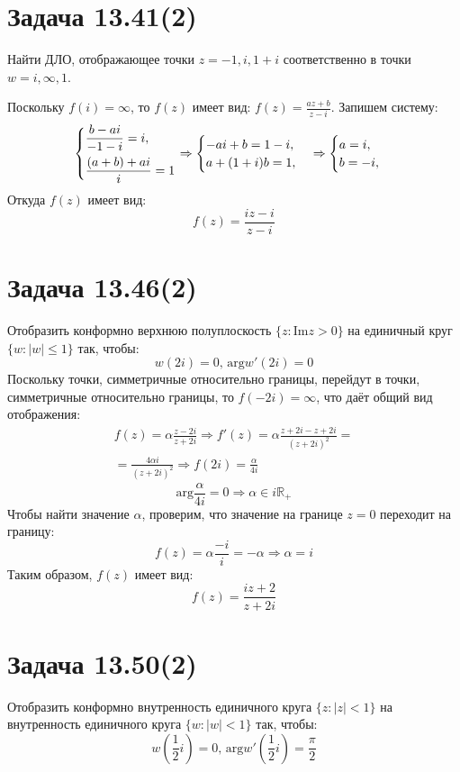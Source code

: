 \documentclass[11pt]{article}
\begin{document}
\section{Задача 13.41(2)}
\label{sec:orga8770dd}
Найти ДЛО, отображающее точки \(z = -1, i, 1 + i\) соответственно в точки \(w = i, \infty, 1\).

Поскольку \(f(i) = \infty\), то \(f(z)\) имеет вид:
\(f(z) = \frac{az + b}{z - i}\). Запишем систему:
\begin{multline*}
\begin{dcases}
\frac{b - ai}{-1 - i} = i, \\
\frac{(a + b) + ai}i = 1
\end{dcases}
\Rightarrow
\begin{cases}
-ai + b = 1 - i, \\
a + (1 + i)b = 1,
\end{cases}
\Rightarrow
\begin{cases}
a = i, \\
b = -i,
\end{cases}
\end{multline*}
Откуда \(f(z)\) имеет вид:
$$f(z) = \frac{iz - i}{z - i}$$
\section{Задача 13.46(2)}
\label{sec:org39fbbc6}
Отобразить конформно верхнюю полуплоскость \(\{z : \mathrm{Im} z > 0\}\) на единичный круг \(\{w : |w| \leq 1\}\)
так, чтобы:
$$w(2i) = 0, \,\mathrm{arg}w'(2i) = 0$$
Поскольку точки, симметричные относительно границы, перейдут в точки, симметричные относительно границы, то \(f(-2i) = \infty\),
что даёт общий вид отображения:
\begin{multline*}
f(z) = \alpha\frac{z - 2i}{z + 2i} \Rightarrow f'(z) = \alpha\frac{z + 2i - z + 2i}{(z + 2i)^2} = \\
= \frac{4\alpha i}{(z + 2i)^2} \Rightarrow f(2i) = \frac{\alpha}{4i}
\end{multline*}
$$\mathrm{arg}\frac{\alpha}{4i} = 0 \Rightarrow \alpha \in i\mathbb{R}_+$$
Чтобы найти значение \(\alpha\), проверим, что значение на границе \(z = 0\) переходит на границу:
$$f(z) = \alpha\frac{-i}{i} = -\alpha \Rightarrow \alpha = i$$
Таким образом, \(f(z)\) имеет вид:
$$f(z) = \frac{iz + 2}{z + 2i}$$
\section{Задача 13.50(2)}
\label{sec:orgf1425a5}
Отобразить конформно внутренность единичного круга \(\{z: |z| < 1\}\) на внутренность единичного круга \(\{w: |w| < 1\}\)
так, чтобы:
$$w\left(\frac{1}2i\right) = 0, \,\mathrm{arg} w'\left(\frac{1}2i\right) = \frac{\pi}2$$
\end{document}
